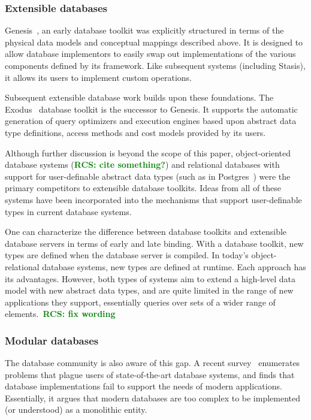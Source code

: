 \documentclass[letterpaper,twocolumn,10pt]{article}
\newcommand{\yad}{Stasis\xspace}
\newcommand{\rcs}[1]{\textcolor{green}{\bf RCS: #1}}
\begin{document}
\subsubsection{Extensible databases}

Genesis~\cite{genesis}, an early database toolkit was explicitly
structured in terms of the physical data models and conceptual 
mappings described above.
It is designed to allow database implementors to easily swap out
implementations of the various components defined by its framework.
Like subsequent systems (including \yad), it allows its users to
implement custom operations.

Subsequent extensible database work builds upon these foundations.
The Exodus~\cite{exodus} database toolkit is the successor to
Genesis. It supports the automatic generation of query optimizers and
execution engines based upon abstract data type definitions, access
methods and cost models provided by its users.

Although further discussion is beyond the scope of this paper,
object-oriented database systems (\rcs{cite something?}) and relational databases with
support for user-definable abstract data types (such as in
Postgres~\cite{postgres}) were the primary competitors to extensible
database toolkits.  Ideas from all of these systems have been
incorporated into the mechanisms that support user-definable types in
current database systems.

One can characterize the difference between database toolkits and
extensible database servers in terms of early and late binding.  With
a database toolkit, new types are defined when the database server is
compiled.  In today's object-relational database systems, new types
are defined at runtime.  Each approach has its advantages.  However,
both types of systems aim to extend a high-level data model with new
abstract data types, and are quite limited in the range of new
applications they support, essentially queries over sets of a wider
range of elements.~\rcs{fix wording}

\subsubsection{Modular databases}

The database community is also aware of this gap.  A recent
survey~\cite{riscDB} enumerates problems that plague users of
state-of-the-art database systems, and finds that database
implementations fail to support the needs of modern applications.
Essentially, it argues that modern databases are too complex to be
implemented (or understood) as a monolithic entity.
\end{document}
